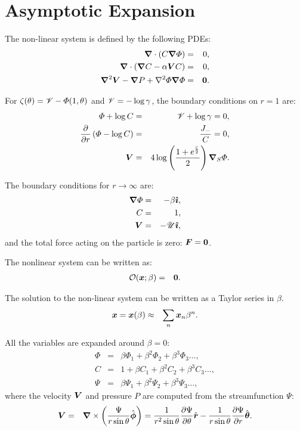 \section{Asymptotic Expansion}

The non-linear system is defined by the following PDEs:
\label{PDEs}
\begin{eqnarray}
\boldsymbol{\nabla} \cdot \left(C \boldsymbol{\nabla} \varPhi\right) &=& 0, \\
\boldsymbol{\nabla} \cdot \left(\boldsymbol{\nabla} C - \alpha \boldsymbol{V} C\right) &=& 0, \\
\boldsymbol{\nabla}^2 \boldsymbol{V} - \boldsymbol{\nabla} P + \nabla^2 \varPhi \boldsymbol{\nabla} \varPhi &=& \boldsymbol{0}.
\end{eqnarray}

For $\zeta(\theta) = \mathscr{V} - \varPhi(1, \theta)$ and 
$\mathscr{V} = -\log \gamma$, the boundary conditions on $r = 1$ are:
\begin{eqnarray}
\varPhi + \log C &=& \mathscr{V} + \log \gamma = 0, \\
\frac{\partial }{\partial r}\left(\varPhi - \log C\right) &=& \frac{J_-}{C} = 0, \\
\boldsymbol{V} &=& 4\log\left(\frac{1 + e^\frac{\zeta}{2}}{2}\right) \boldsymbol{\nabla}_S \varPhi.
\end{eqnarray}

The boundary conditions for $r \rightarrow \infty$ are:
\begin{eqnarray}
\boldsymbol{\nabla} \varPhi &=& -\beta \boldsymbol{\hat{\imath}}, \\
C &=& 1, \\
\boldsymbol{V} &=& -\mathscr{U} \boldsymbol{\hat{\imath}},
\end{eqnarray}
and the total force acting on the particle is zero: $\boldsymbol{F} = \boldsymbol{0}$.

The nonlinear system can be written as: 
\begin{eqnarray}
\mathcal{O}(\boldsymbol{x};\beta) &=& \boldsymbol{0}.
\end{eqnarray}

The solution to the non-linear system can be written as a Taylor series in $\beta$.
\begin{eqnarray}
\boldsymbol{x} = \boldsymbol{x}(\beta) &\approx& \sum_n \boldsymbol{x}_n \beta^n.
\end{eqnarray}

All the variables are expanded around $\beta = 0$:
\begin{eqnarray}
\varPhi &=& \beta \varPhi_1 + \beta^2 \varPhi_2 + \beta^3 \varPhi_3 \ldots, \\
C &=& 1 + \beta C_1 + \beta^2 C_2 + \beta^3 C_3 \ldots, \\
\Psi &=& \beta \Psi_1 + \beta^2 \Psi_2 + \beta^3 \Psi_3 \ldots ,
\end{eqnarray}
where the velocity $\boldsymbol{V}$ and pressure $P$ are computed from the streamfunction $\Psi$:
\begin{eqnarray}
\boldsymbol{V} &=& \boldsymbol{\nabla} \times \left(\frac{\Psi}{r \sin\theta} \hat{\boldsymbol{\phi}}\right) 
= \frac{1}{r^2 \sin\theta} \frac{\partial \Psi}{\partial \theta} \hat{\boldsymbol{r}} 
- \frac{1}{r \sin\theta} \frac{\partial \Psi}{\partial r} \hat{\boldsymbol{\theta}}.
\end{eqnarray}

